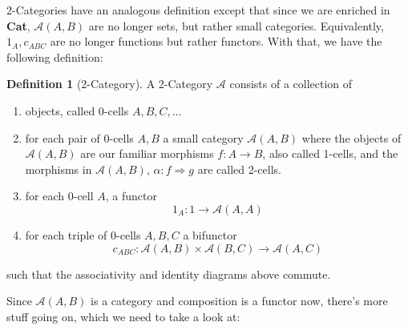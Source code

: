 \documentclass[11pt]{article}
\theoremstyle{definition}
\newtheorem*{defn}{Definition}
\theoremstyle{definition}
\theoremstyle{plain}
\theoremstyle{plain}
\theoremstyle{plain}
\begin{document}
2-Categories have an analogous definition except that since we are enriched in \textbf{Cat}, $\mathscr{A}(A,B)$ are no longer sets, but rather small categories. Equivalently, $1_A, c_{ABC}$ are no longer functions but rather functors. With that, we have the following definition:

\begin{defn}[2-Category]
A 2-Category $\mathscr{A}$ consists of a collection of

\begin{enumerate}
\item objects, called 0-cells $A, B, C, \dots$
\item for each pair of 0-cells $A,B$ a small category $\mathscr{A}(A,B)$ where the objects of $\mathscr{A}(A,B)$ are our familiar morphisms $f:A \to B$, also called 1-cells, and the morphisms in $\mathscr{A}(A,B)$, $\alpha: f \Rightarrow g$ are called 2-cells.
\item for each 0-cell $A$, a functor
\begin{equation*}
1_A: 1 \to \mathscr{A}(A,A)
\end{equation*}
\item for each triple of 0-cells $A,B,C$ a bifunctor
\begin{equation*}
c_{ABC}: \mathscr{A}(A,B) \times \mathscr{A}(B,C) \to \mathscr{A}(A,C)
\end{equation*}
\end{enumerate}

such that the associativity and identity diagrams above commute.
\end{defn}

Since $\mathscr{A}(A,B)$ is a category and composition is a functor now, there's more stuff going on, which we need to take a look at:



\nocite{*}


\end{document}
